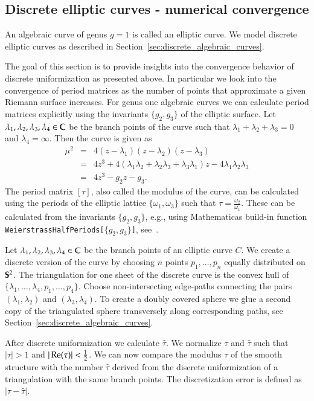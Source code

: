 \documentclass[Thesis.tex]{subfiles}
\begin{document}
  \subsection{Discrete elliptic curves - numerical convergence}

  An algebraic curve of genus $g=1$ is called an elliptic curve. We model discrete elliptic curves as described in Section~\ref{sec:discrete_algebraic_curves}.

  The goal of this section is to provide insights into the convergence behavior of discrete uniformization as presented above. In particular we look into the convergence of period matrices as the number of points that approximate a given Riemann surface increases. For genus one algebraic curves we can calculate period matrices explicitly using the invariants $\{g_2,g_3\}$ of the elliptic surface. Let $\lambda_1,\lambda_2,\lambda_3,\lambda_4\in\C$ be the branch points of the curve such that $\lambda_1+\lambda_2+\lambda_3=0$ and $\lambda_4=\infty$. Then the curve is given as
  \begin{eqnarray*}
  \mu^2&=&4(z-\lambda_1)(z-\lambda_2)(z-\lambda_3)\\
  &=&4z^3+4(\lambda_1\lambda_2+\lambda_2\lambda_3+\lambda_3\lambda_1)z - 4\lambda_1\lambda_2\lambda_3\\
  &=&4z^3-g_2z-g_3.
  \end{eqnarray*}
  The period matrix $[\tau]$, also called the modulus of the curve, can be calculated using the periods of the elliptic lattice $\{\omega_1,\omega_3\}$ such that $\tau = \frac{\omega_2}{\omega_1}$. These can be calculated from the invariants $\{g_2,g_3\}$, e.g., using {\sc Mathematica}s build-in function {\tt WeierstrassHalfPeriods[$\{g_2,g_3\}$]}, see~\cite{WeierstrassHalfPeriods_website}.

  Let $\lambda_1, \lambda_2, \lambda_3, \lambda_4 \in \C$ be the branch points of an elliptic curve $C$. We create a discrete version of the curve by choosing $n$ points $p_1,\ldots,p_n$ equally distributed on $\S^2$. The triangulation for one sheet of the discrete curve is the convex hull of $\{\lambda_1,\ldots,\lambda_4,p_1,\ldots, p_4\}$. Choose non-intersecting edge-paths connecting the pairs $(\lambda_1,\lambda_2)$ and $(\lambda_3,\lambda_4)$. To create a doubly covered sphere we glue a second copy of the triangulated sphere transversely along corresponding paths, see Section~\ref{sec:discrete_algebraic_curves}.

  After discrete uniformization we calculate $\hat \tau$. We normalize $\tau$ and $\hat \tau$ such that $|\tau|>1$ and $|\re(\tau)| < \frac{1}{2}$. We can now compare the modulus $\tau$ of the smooth structure with the number $\hat \tau$ derived from the discrete uniformization of a triangulation with the same branch points. The discretization error is defined as $|\tau-\hat \tau|$.
\end{document}
